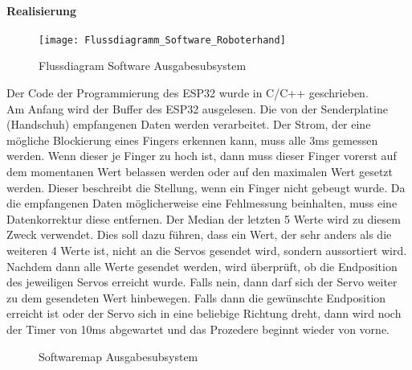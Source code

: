 \documentclass[titlepage,12pt,twoside]{article}
\begin{document}
\paragraph{Realisierung}
\hfill \break
\hfill \break
\begin{figure}[H]
	\begin{center}
		\scalebox{0.5}
		{\texttt{[image: Flussdiagramm\_Software\_Roboterhand]}}
		\caption{Flussdiagram Software Ausgabesubsystem}
		\label{fig:Flussdiagramm_Software_Roboterhand}		
	\end{center}
\end{figure}
\hfill \break
Der Code der Programmierung des ESP32 wurde in C/C++ geschrieben. \\
Am Anfang wird der Buffer des ESP32 ausgelesen. Die von der Senderplatine (Handschuh) empfangenen Daten werden verarbeitet. 
Der Strom, der eine mögliche Blockierung eines Fingers erkennen kann, muss alle 3ms gemessen werden. Wenn dieser je Finger zu 
hoch ist, dann muss dieser Finger vorerst auf dem momentanen Wert belassen werden oder auf den maximalen Wert gesetzt werden. 
Dieser beschreibt die Stellung, wenn ein Finger nicht gebeugt wurde. Da die empfangenen Daten möglicherweise eine Fehlmessung 
beinhalten, muss eine Datenkorrektur diese entfernen. Der Median der letzten 5 Werte wird zu diesem Zweck verwendet. Dies soll 
dazu führen, dass ein Wert, der sehr anders als die weiteren 4 Werte ist, nicht an die Servos gesendet wird, sondern aussortiert 
wird. Nachdem dann alle Werte gesendet werden, wird überprüft, ob die Endposition des jeweiligen Servos erreicht wurde. Falls 
nein, dann darf sich der Servo weiter zu dem gesendeten Wert hinbewegen. Falls dann die gewünschte Endposition erreicht ist 
oder der Servo sich in eine beliebige Richtung dreht, dann wird noch der Timer von 10ms abgewartet und das Prozedere beginnt 
wieder von vorne.
\\
\begin{figure}[H]
	\centering
\end{figure}
\begin{figure}[H]
	\centering
\end{figure}
\begin{figure}[H]
	\centering
	\caption{Softwaremap Ausgabesubsystem}
	\label{fig:Softwaremap_3}	
\end{figure}
\end{document}
